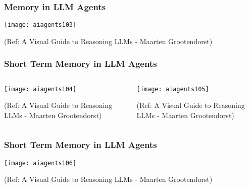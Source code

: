 \begin{frame}[fragile]\frametitle{Memory in LLM Agents}

        \begin{center}
        \texttt{[image: aiagents103]}

		
        {\tiny (Ref: A Visual Guide to Reasoning LLMs - Maarten Grootendorst)}
        \end{center}


\end{frame}

\begin{frame}[fragile]\frametitle{Short Term Memory in LLM Agents}


\begin{columns}
    \begin{column}[T]{0.6\linewidth}
        \begin{center}
        \texttt{[image: aiagents104]}

		
        {\tiny (Ref: A Visual Guide to Reasoning LLMs - Maarten Grootendorst)}
        \end{center}

    \end{column}
    \begin{column}[T]{0.4\linewidth}
        \begin{center}
        \texttt{[image: aiagents105]}

		
        {\tiny (Ref: A Visual Guide to Reasoning LLMs - Maarten Grootendorst)}
        \end{center}
    \end{column}
  \end{columns}

\end{frame}

\begin{frame}[fragile]\frametitle{Short Term Memory in LLM Agents}



        \begin{center}
        \texttt{[image: aiagents106]}

		
        {\tiny (Ref: A Visual Guide to Reasoning LLMs - Maarten Grootendorst)}
        \end{center}

\end{frame}

